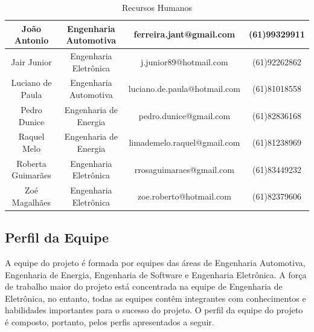 \begin{table}[H]
\begin{tabular}{|l|l|l|l|}
\multicolumn{1}{|c}{João Antonio}            &  \multicolumn{1}{|c}{Engenharia Automotiva}         &         \multicolumn{1}{|c|}{ferreira.jant@gmail.com}                                 & \multicolumn{1}{|c|}{(61)99329911}          \\ \hline
 \multicolumn{1}{|c}{Jair Junior}          &      \multicolumn{1}{|c}{Engenharia Eletrônica}         &             \multicolumn{1}{|c|}{j.junior89@hotmail.com}           & \multicolumn{1}{|c|}{(61)92262862}         \\ \hline
 \multicolumn{1}{|c}{Luciano de Paula}      &  \multicolumn{1}{|c}{Engenharia Automotiva}             &          \multicolumn{1}{|c|}{luciano.de.paula@hotmail.com}          & \multicolumn{1}{|c|}{(61)81018558}         \\ \hline
 \multicolumn{1}{|c}{Pedro Dunice}        &        \multicolumn{1}{|c}{Engenharia de Energia}       &               \multicolumn{1}{|c|}{pedro.dunice@gmail.com}                & \multicolumn{1}{|c|}{(61)82836168}          \\ \hline
 \multicolumn{1}{|c}{Raquel Melo}           &         \multicolumn{1}{|c}{Engenharia de Energia}        &              \multicolumn{1}{|c|}{limademelo.raquel@gmail.com}            & \multicolumn{1}{|c|}{(61)81238969}          \\ \hline
 \multicolumn{1}{|c}{Roberta Guimarães}         & \multicolumn{1}{|c}{Engenharia Eletrônica}     &      \multicolumn{1}{|c|}{rrosaguimaraes@gmail.com}              & \multicolumn{1}{|c|}{(61)83449232}          \\ \hline
 \multicolumn{1}{|c}{Zoé Magalhães}        &        \multicolumn{1}{|c}{Engenharia Eletrônica}                                 &             \multicolumn{1}{|c|}{zoe.roberto@hotmail.com}          & \multicolumn{1}{|c|}{(61)82379606}  \\ \hline
\end{tabular}
\caption{Recursos Humanos}
\end{table}

\subsection[Perfil da Equipe]{Perfil da Equipe}

A equipe do projeto é formada por equipes das áreas de Engenharia Automotiva, Engenharia de Energia, Engenharia de Software e Engenharia Eletrônica. A força de trabalho maior do projeto está concentrada na equipe de Engenharia de Eletrônica, no entanto, todas as equipes contêm integrantes com conhecimentos e habilidades importantes para o sucesso do projeto. O perfil da equipe do projeto é composto, portanto, pelos perfis apresentados a seguir.


